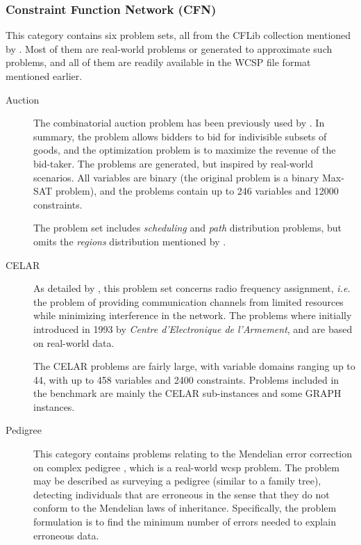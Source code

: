 \subsubsection{Constraint Function Network (CFN)}
This category contains six problem sets, all from the CFLib collection mentioned by \textcite[\pno~3]{deGivry14}.
Most of them are real-world problems or generated to approximate such problems, and all of them are readily available in the WCSP file format mentioned earlier.

\begin{description}
	\item[Auction]
		The combinatorial auction problem has been previously used by \textcites{Larrosa08}{Sandholm99}.
		In summary, the problem allows bidders to bid for indivisible subsets of goods, and the optimization problem is to maximize the revenue of the bid-taker.
		The problems are generated, but inspired by real-world scenarios.
		All variables are binary (the original problem is a binary Max-SAT problem), and the problems contain up to \num{246} variables and \num{12000} constraints.

		The problem set includes \emph{scheduling} and \emph{path} distribution problems, but omits the \emph{regions} distribution mentioned by \textcite[\pno~228]{Larrosa08}.

	\item[CELAR]
		As detailed by \textcite{Cabon99} \parencite[and to some extent][\pno~315\psq]{Meseguer06}, this problem set concerns radio frequency assignment, \emph{i.e.} the problem of providing communication channels from limited resources while minimizing interference in the network.
		The problems where initially introduced in 1993 by \emph{Centre d’Electronique de l’Armement}, and are based on real-world data.

		The CELAR problems are fairly large, with variable domains ranging up to \num{44}, with up to \num{458} variables and \num{2400} constraints.
		Problems included in the benchmark are mainly the CELAR sub-instances \parencite[\pno~85]{Cabon99} and some GRAPH instances.

	\item[Pedigree]
		This category contains problems relating to the Mendelian error correction on complex pedigree \parencites{Sanchez08}[\pno~317\psq]{Meseguer06}, which is a real-world \gls{wcsp} problem.
		The problem may be described as surveying a pedigree (similar to a family tree), detecting individuals that are erroneous in the sense that they do not conform to the Mendelian laws of inheritance.
		Specifically, the problem formulation is to find the minimum number of errors needed to explain erroneous data.


\end{description}
